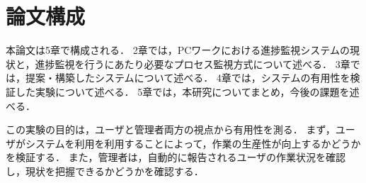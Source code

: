 \section{論文構成}
本論文は5章で構成される．
2章では，PCワークにおける進捗監視システムの現状と，進捗監視を行うにあたり必要なプロセス監視方式について述べる．
3章では，提案・構築したシステムについて述べる．
4章では，システムの有用性を検証した実験について述べる．
5章では，本研究についてまとめ，今後の課題を述べる．



この実験の目的は，ユーザと管理者両方の視点から有用性を測る．
まず，ユーザがシステムを利用を利用することによって，作業の生産性が向上するかどうかを検証する．
また，管理者は，自動的に報告されるユーザの作業状況を確認し，現状を把握できるかどうかを確認する．
